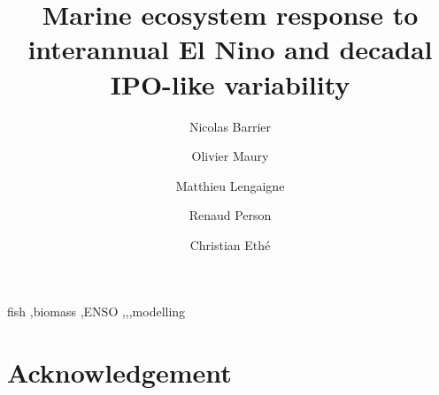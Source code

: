 \documentclass[review, 12pt]{elsarticle}
\begin{document}
\begin{frontmatter}

\title{Marine ecosystem response to interannual El Nino and decadal IPO-like variability}

\author[mymainaddress]{Nicolas Barrier}

\author[mymainaddress]{Olivier Maury}
\author[mymainaddress]{Matthieu Lengaigne}
\author[renaud]{Renaud Person}
\author[chris]{Christian Eth\'{e}}


\address[mymainaddress]{MARBEC, Univ. Montpellier, CNRS, Ifremer, IRD, Sète, France}
\address[renaud]{LOCEAN, IRD}
\address[chris]{IPSL, CNRS}

\begin{abstract}

\end{abstract}

\begin{keyword}
fish \sep biomass \sep ENSO \sep \nino \sep \nina \sep modelling
\end{keyword}

\end{frontmatter}

\linenumbers

%
%
\newpage




%

\section*{Acknowledgement}
\end{document}
